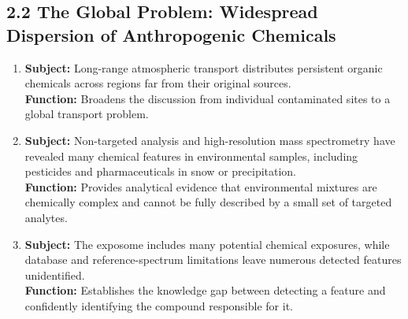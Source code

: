 \documentclass[11pt]{article}
\begin{document}
\begin{doublespace}
    \subsection{2.2 The Global Problem: Widespread Dispersion of Anthropogenic Chemicals}
        \begin{enumerate}[label=\textbf{Paragraph \arabic*:}, start=4, leftmargin=*]
            \item \textbf{Subject:} Long-range atmospheric transport distributes persistent organic chemicals across regions far from their original sources.\\
            \textbf{Function:} Broadens the discussion from individual contaminated sites to a global transport problem.
            \item \textbf{Subject:} Non-targeted analysis and high-resolution mass spectrometry have revealed many chemical features in environmental samples, including pesticides and pharmaceuticals in snow or precipitation.\\
            \textbf{Function:} Provides analytical evidence that environmental mixtures are chemically complex and cannot be fully described by a small set of targeted analytes.
            \item \textbf{Subject:} The exposome includes many potential chemical exposures, while database and reference-spectrum limitations leave numerous detected features unidentified.\\
            \textbf{Function:} Establishes the knowledge gap between detecting a feature and confidently identifying the compound responsible for it.
        \end{enumerate}


\end{doublespace}
\end{document}
